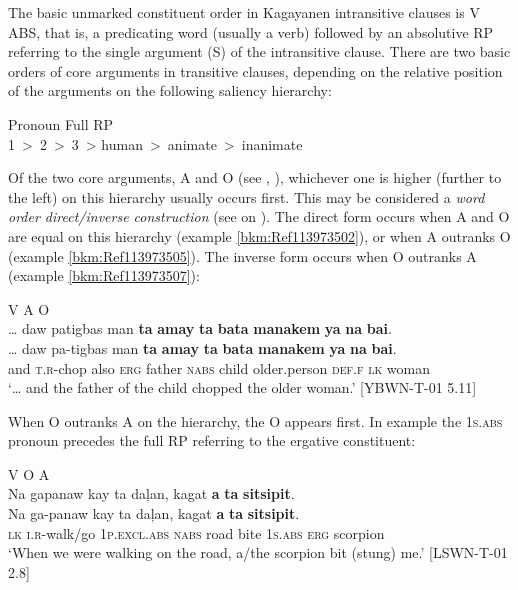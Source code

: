 The basic unmarked constituent order in Kagayanen intransitive clauses is V ABS, that is, a predicating word (usually a verb) followed by an absolutive RP referring to the single argument (S) of the intransitive clause. There are two basic orders of core arguments in transitive clauses, depending on the relative position of the arguments on the following saliency hierarchy:


\ea 
Pronoun\hspace{.5cm}    Full RP \\
1~>~2~>~3~>  {\textbar}  human~>~animate~>~inanimate
\z

Of the two core arguments, A and O (see , ), whichever one is higher (further to the left) on this hierarchy usually occurs first. This may be considered a \textit{word order direct/inverse construction} (see \citealt{payne1994} on ). The direct form occurs when A and O are equal on this hierarchy (example \ref{bkm:Ref113973502}), or when A outranks O (example \ref{bkm:Ref113973505}). The inverse form occurs when O outranks A (example \ref{bkm:Ref113973507}):

\ea 
\label{bkm:Ref113973502}
\hspace{1.1cm} V\hspace{2cm}          A\hspace{2.1cm}          O \\
… daw  patigbas  man  \textbf{ta}  \textbf{amay}  \textbf{ta}  \textbf{bata}  \textbf{manakem}  \textbf{ya}  \textbf{na}  \textbf{bai}. \\\smallskip
\gll … daw  pa-tigbas  man  \textbf{ta}  \textbf{amay}  \textbf{ta}  \textbf{bata}  \textbf{manakem}  \textbf{ya}  \textbf{na}  \textbf{bai}. \\
{} and  \textsc{t.r}-chop  also  \textsc{erg}  father  \textsc{nabs}  child  older.person  \textsc{def.f}  \textsc{lk}  woman \\
\glt ‘… and the father of the child chopped the older woman.’ [YBWN-T-01 5.11]
\z

When O outranks A on the hierarchy, the O appears first. In example  the 1\textsc{s.abs} pronoun precedes the full RP referring to the ergative constituent:

\ea 
\label{bkm:Ref113973507}
\hspace{4.4cm}V\hspace{.4cm} O\hspace{.1cm} A \\
Na  gapanaw  kay  ta  daļan,  kagat  \textbf{a}  \textbf{ta}  \textbf{sitsipit}. \\\smallskip
\gll Na  ga-panaw  kay  ta  daļan,  kagat  \textbf{a}  \textbf{ta}  \textbf{sitsipit}. \\
\textsc{lk}  \textsc{i.r}-walk/go  1\textsc{p.excl.abs}  \textsc{nabs}  road  bite  1\textsc{s.abs}  \textsc{erg}  scorpion \\
\glt ‘When we were walking on the road, a/the scorpion bit (stung) me.’ [LSWN-T-01 2.8]
\z

